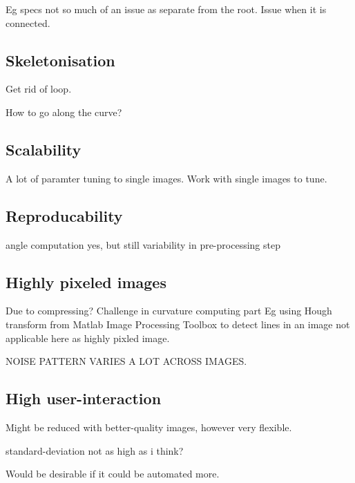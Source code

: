 Eg specs not so much of an issue as separate from the root.
Issue when it is connected.


\subsection{Skeletonisation}
Get rid of loop.

How to go along the curve?


\subsection{Scalability}

A lot of paramter tuning to single images. Work with single images to tune.


\subsection{Reproducability}

angle computation yes, but still variability in pre-processing step


\subsection{Highly pixeled images}
Due to compressing? 
Challenge in curvature computing part
Eg using Hough transform from Matlab Image Processing Toolbox to detect lines in an image not applicable here as highly pixled image.



NOISE PATTERN VARIES A LOT ACROSS IMAGES.

\subsection{High user-interaction}
Might be reduced with better-quality images, however very flexible.


standard-deviation not as high as i think?

Would be desirable if it could be automated more. 


